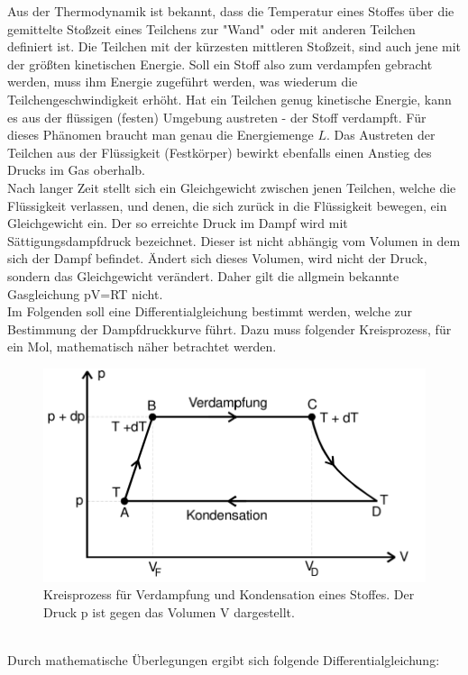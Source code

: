 Aus der Thermodynamik ist bekannt, dass die Temperatur eines Stoffes über die gemittelte Stoßzeit eines Teilchens zur "Wand"\, oder mit anderen Teilchen definiert ist. Die Teilchen
mit der kürzesten mittleren Stoßzeit, sind auch jene mit der größten kinetischen Energie. Soll ein Stoff also zum verdampfen gebracht werden, muss ihm Energie zugeführt werden,
was wiederum die Teilchengeschwindigkeit erhöht. Hat ein Teilchen genug kinetische Energie, kann es aus der flüssigen (festen) Umgebung austreten - der Stoff verdampft. Für dieses Phänomen
braucht man genau die Energiemenge $L$. Das Austreten der Teilchen aus der Flüssigkeit (Festkörper) bewirkt ebenfalls einen Anstieg des Drucks im Gas oberhalb.\\
Nach langer Zeit stellt sich ein Gleichgewicht zwischen jenen Teilchen, welche die Flüssigkeit verlassen, und denen, die sich zurück in die Flüssigkeit bewegen, ein Gleichgewicht ein. Der so erreichte Druck im Dampf 
wird mit Sättigungsdampfdruck bezeichnet. Dieser ist nicht abhängig vom Volumen in dem sich der Dampf befindet. Ändert sich dieses Volumen, wird nicht der Druck, sondern das Gleichgewicht verändert. Daher gilt die allgmein bekannte Gasgleichung
pV=RT nicht.\\
Im Folgenden soll eine Differentialgleichung bestimmt werden, welche zur Bestimmung der Dampfdruckkurve führt.
Dazu muss folgender Kreisprozess, für ein Mol, mathematisch näher betrachtet werden.
\begin{figure}[h!]
    \centering
    \includegraphics[scale=0.8]{sreen2.jpg}
    \caption{Kreisprozess für Verdampfung und Kondensation eines Stoffes. Der Druck p ist
    gegen das Volumen V dargestellt.}
    \label{Abb2:Kreisprozess}
\end{figure}
\\
Durch mathematische Überlegungen ergibt sich folgende Differentialgleichung:
